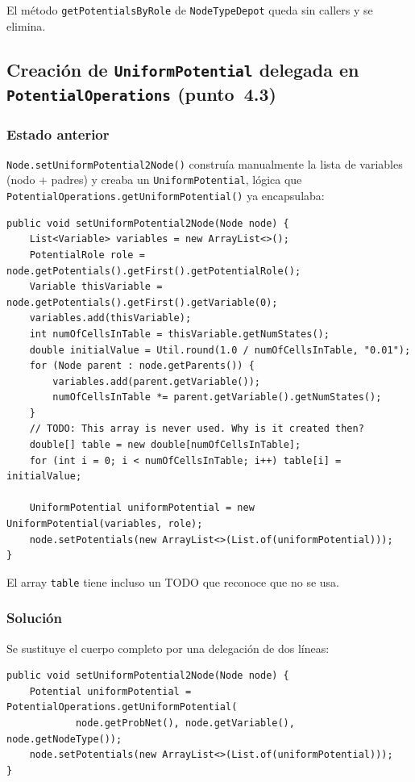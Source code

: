 \documentclass[11pt,a4paper]{article}
\newcommand{\code}[1]{\texttt{#1}}
\begin{document}
El método \code{getPotentialsByRole} de \code{NodeTypeDepot} queda sin
callers y se elimina.

\subsection{Creación de \code{UniformPotential} delegada en
            \code{PotentialOperations} (punto~4.3)}

\subsubsection*{Estado anterior}

\code{Node.setUniformPotential2Node()} construía manualmente la lista de
variables (nodo + padres) y creaba un \code{UniformPotential}, lógica
que \code{PotentialOperations.getUniformPotential()} ya encapsulaba:

\begin{lstlisting}
public void setUniformPotential2Node(Node node) {
    List<Variable> variables = new ArrayList<>();
    PotentialRole role = node.getPotentials().getFirst().getPotentialRole();
    Variable thisVariable = node.getPotentials().getFirst().getVariable(0);
    variables.add(thisVariable);
    int numOfCellsInTable = thisVariable.getNumStates();
    double initialValue = Util.round(1.0 / numOfCellsInTable, "0.01");
    for (Node parent : node.getParents()) {
        variables.add(parent.getVariable());
        numOfCellsInTable *= parent.getVariable().getNumStates();
    }
    // TODO: This array is never used. Why is it created then?
    double[] table = new double[numOfCellsInTable];
    for (int i = 0; i < numOfCellsInTable; i++) table[i] = initialValue;

    UniformPotential uniformPotential = new UniformPotential(variables, role);
    node.setPotentials(new ArrayList<>(List.of(uniformPotential)));
}
\end{lstlisting}

El array \code{table} tiene incluso un TODO que reconoce que no se usa.

\subsubsection*{Solución}

Se sustituye el cuerpo completo por una delegación de dos líneas:

\begin{lstlisting}
public void setUniformPotential2Node(Node node) {
    Potential uniformPotential = PotentialOperations.getUniformPotential(
            node.getProbNet(), node.getVariable(), node.getNodeType());
    node.setPotentials(new ArrayList<>(List.of(uniformPotential)));
}
\end{lstlisting}
\end{document}

